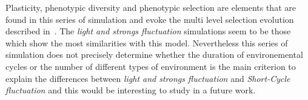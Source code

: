 Plasticity, phenotypic diversity and phenotypic selection are elements that are found in this series of simulation and evoke the  multi level selection evolution described in~\citep{jablonka2014evolution}. The \emph{light and strongs fluctuation} simulations seem to be those which show the most similarities with this model. Nevertheless this series of simulation does not precisely determine whether the duration of environemental cycles or the number of different types of environment is the main criterion to explain the differences between \emph{light and strongs fluctuation} and \emph{Short-Cycle fluctuation} and this would be interesting to study in a future work.